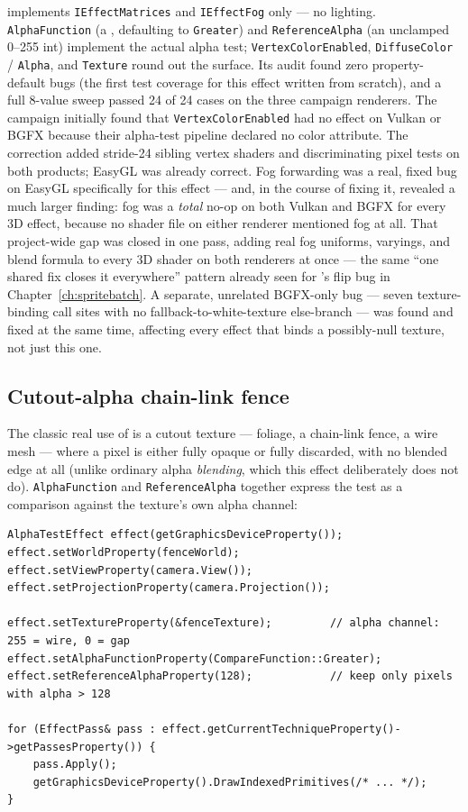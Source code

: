  implements \texttt{IEffectMatrices} and \texttt{IEffectFog} only
--- no lighting. \texttt{AlphaFunction} (a , defaulting to
\texttt{Greater}) and \texttt{ReferenceAlpha} (an unclamped 0--255 int) implement the actual
alpha test; \texttt{VertexColorEnabled}, \texttt{DiffuseColor} / \texttt{Alpha}, and
\texttt{Texture} round out the surface. Its audit found zero property-default bugs (the
first test coverage for this effect written from scratch), and a full 8-value
 sweep passed 24 of 24 cases on the three campaign renderers. The
campaign initially found that \texttt{VertexColorEnabled} had no effect on Vulkan or BGFX because
their alpha-test pipeline declared no color attribute. The correction added
stride-24 sibling vertex shaders and discriminating pixel tests on both products; EasyGL was
already correct. Fog forwarding was a real, fixed bug on EasyGL
specifically for this effect --- and, in the course of fixing it, revealed a much larger
finding: fog was a \emph{total} no-op on both Vulkan and BGFX for every 3D effect, because no
shader file on either renderer mentioned fog at all. That project-wide gap was closed in one
pass, adding real fog uniforms, varyings, and blend formula to every 3D shader on both
renderers at once --- the same ``one shared fix closes it everywhere'' pattern already seen
for 's flip bug in Chapter~\ref{ch:spritebatch}. A separate, unrelated
BGFX-only bug --- seven texture-binding call sites with no fallback-to-white-texture
else-branch --- was found and fixed at the same time, affecting every effect that binds a
possibly-null texture, not just this one.

\subsection{Cutout-alpha chain-link fence}

The classic real use of  is a cutout texture --- foliage, a
chain-link fence, a wire mesh --- where a pixel is either fully opaque or fully discarded, with
no blended edge at all (unlike ordinary alpha \emph{blending}, which this effect deliberately
does not do). \texttt{AlphaFunction} and \texttt{ReferenceAlpha} together express the test as a
comparison against the texture's own alpha channel:

\begin{lstlisting}
AlphaTestEffect effect(getGraphicsDeviceProperty());
effect.setWorldProperty(fenceWorld);
effect.setViewProperty(camera.View());
effect.setProjectionProperty(camera.Projection());

effect.setTextureProperty(&fenceTexture);         // alpha channel: 255 = wire, 0 = gap
effect.setAlphaFunctionProperty(CompareFunction::Greater);
effect.setReferenceAlphaProperty(128);            // keep only pixels with alpha > 128

for (EffectPass& pass : effect.getCurrentTechniqueProperty()->getPassesProperty()) {
    pass.Apply();
    getGraphicsDeviceProperty().DrawIndexedPrimitives(/* ... */);
}
\end{lstlisting}

